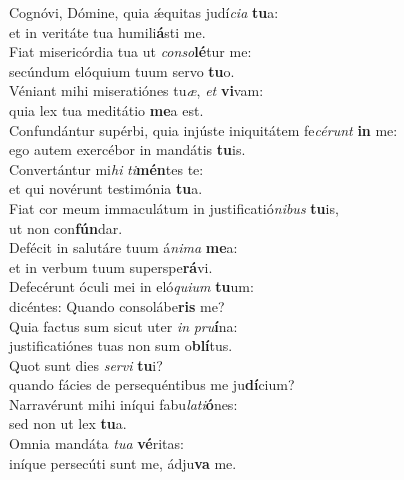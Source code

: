 \oddverse Cognóvi, Dómine, quia ǽquitas judí\textit{ci}\textit{a} \textbf{tu}a:~\*\\
\oddverse et in veritáte tua humili\textbf{á}sti me.\\
\evenverse Fiat misericórdia tua ut \textit{con}\textit{so}\textbf{lé}tur me:~\*\\
\evenverse secúndum elóquium tuum servo \textbf{tu}o.\\
\oddverse Véniant mihi miseratiónes tu\textit{æ}, \textit{et} \textbf{vi}vam:~\*\\
\oddverse quia lex tua meditátio \textbf{me}a est.\\
\evenverse Confundántur supérbi, quia injúste iniquitátem fe\textit{cé}\textit{runt} \textbf{in} me:~\*\\
\evenverse ego autem exercébor in mandátis \textbf{tu}is.\\
\oddverse Convertántur mi\textit{hi} \textit{ti}\textbf{mén}tes te:~\*\\
\oddverse et qui novérunt testimónia \textbf{tu}a.\\
\evenverse Fiat cor meum immaculátum in justificatió\textit{ni}\textit{bus} \textbf{tu}is,~\*\\
\evenverse ut non con\textbf{fún}dar.\\
\oddverse Defécit in salutáre tuum á\textit{ni}\textit{ma} \textbf{me}a:~\*\\
\oddverse et in verbum tuum superspe\textbf{rá}vi.\\
\evenverse Defecérunt óculi mei in eló\textit{qui}\textit{um} \textbf{tu}um:~\*\\
\evenverse dicéntes: Quando consolábe\textbf{ris} me?\\
\oddverse Quia factus sum sicut uter \textit{in} \textit{pru}\textbf{í}na:~\*\\
\oddverse justificatiónes tuas non sum o\textbf{blí}tus.\\
\evenverse Quot sunt dies \textit{ser}\textit{vi} \textbf{tu}i?~\*\\
\evenverse quando fácies de persequéntibus me ju\textbf{dí}cium?\\
\oddverse Narravérunt mihi iníqui fabu\textit{la}\textit{ti}\textbf{ó}nes:~\*\\
\oddverse sed non ut lex \textbf{tu}a.\\
\evenverse Omnia mandáta \textit{tu}\textit{a} \textbf{vé}ritas:~\*\\
\evenverse iníque persecúti sunt me, ádju\textbf{va} me.\\
